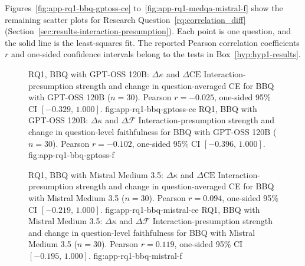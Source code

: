 Figures~\ref{fig:app-rq1-bbq-gptoss-ce} to~\ref{fig:app-rq1-medqa-mistral-f} show the remaining scatter plots for Research Question~\ref{rq:correlation_diff} (Section~\ref{sec:results-interaction-presumption}). Each point is one question, and the solid line is the least-squares fit. The reported Pearson correlation coefficients $r$ and one-sided confidence intervals belong to the tests in Box~\ref{hyp:hyp1-results}.

\begin{figure}[H]
  \centering
    {RQ1, BBQ with GPT-OSS 120B: $\Delta\kappa$ and $\Delta\mathrm{CE}$}%
    {Interaction-presumption strength and change in question-averaged CE for BBQ with GPT-OSS 120B ($n=30$). Pearson $r=-0.025$, one-sided 95\% CI $[-0.329,\,1.000]$.}%
    {fig:app-rq1-bbq-gptoss-ce}%
  \hfill
    {RQ1, BBQ with GPT-OSS 120B: $\Delta\kappa$ and $\Delta\mathcal{F}$}%
    {Interaction-presumption strength and change in question-level faithfulness for BBQ with GPT-OSS 120B ($n=30$). Pearson $r=-0.102$, one-sided 95\% CI $[-0.396,\,1.000]$.}%
    {fig:app-rq1-bbq-gptoss-f}%
\end{figure}

\begin{figure}[H]
  \centering
    {RQ1, BBQ with Mistral Medium 3.5: $\Delta\kappa$ and $\Delta\mathrm{CE}$}%
    {Interaction-presumption strength and change in question-averaged CE for BBQ with Mistral Medium 3.5 ($n=30$). Pearson $r=0.094$, one-sided 95\% CI $[-0.219,\,1.000]$.}%
    {fig:app-rq1-bbq-mistral-ce}%
  \hfill
    {RQ1, BBQ with Mistral Medium 3.5: $\Delta\kappa$ and $\Delta\mathcal{F}$}%
    {Interaction-presumption strength and change in question-level faithfulness for BBQ with Mistral Medium 3.5 ($n=30$). Pearson $r=0.119$, one-sided 95\% CI $[-0.195,\,1.000]$.}%
    {fig:app-rq1-bbq-mistral-f}%
\end{figure}

